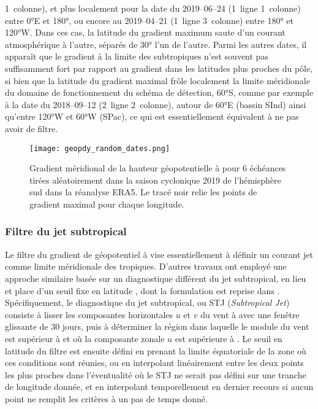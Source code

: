 \documentclass[../main.tex]{subfiles}
\begin{document}
1\iere~colonne), et plus localement pour la date du 2019--06--24 (1\iere~ligne 1\iere~colonne) entre \ang{0}E et \ang{180}, ou encore au 2019--04--21
(1\iere~ligne 3\ieme~colonne) entre \ang{180} et \ang{120}W. Dans ces cas, la latitude du gradient maximum saute d'un courant atmosphérique à l'autre, séparés
de \ang{30} l'un de l'autre. Parmi les autres dates, il apparaît que le gradient à la limite des subtropiques n'est souvent pas suffisamment fort par rapport au
gradient dans les latitudes plus proches du pôle, si bien que la latitude du gradient maximal frôle localement la limite méridionale du domaine de
fonctionnement du schéma de détection, \ang{60}S, comme par exemple à la date du 2018--09--12 (2\ieme~ligne 2\ieme~colonne), autour de \ang{60}E (bassin SInd)
ainsi qu'entre \ang{120}W et \ang{60}W (SPac), ce qui est essentiellement équivalent à ne pas avoir de filtre.
%
\begin{figure}[tb]
    \centering
    \texttt{[image: geopdy\_random\_dates.png]}
    \caption{Gradient méridional de la hauteur géopotentielle à  pour 6 échéances tirées aléatoirement dans la saison cyclonique 2019 de l'hémisphère
    sud dans la réanalyse ERA5. Le tracé noir relie les points de gradient maximal pour chaque longitude.}
    \label{fig:geopdy_random}
\end{figure}

\subsubsection*{Filtre du jet subtropical}

Le filtre du gradient de géopotentiel à  vise essentiellement à définir un courant jet comme limite méridionale des tropiques. D'autres travaux ont
employé une approche similaire basée sur un diagnostique différent du jet subtropical, en lieu et place d'un seuil fixe en latitude
\parencite{tory_projected_2013,tory_sea_2015,bell_statistical_2018}, dont la formulation est reprise dans \textcite{bourdin_intercomparison_2022}. Spécifiquement,
le diagnostique du jet subtropical, ou STJ (\textit{Subtropical Jet}) consiste à lisser les composantes horizontales $u$ et $v$ du vent à  avec une
fenêtre glissante de 30 jours, puis à déterminer la région dans laquelle le module du vent est supérieur à  et où la composante zonale $u$ est supérieure
à . Le seuil en latitude du filtre est ensuite défini en prenant la limite équatoriale de la zone où ces conditions sont réunies, ou en interpolant
linéairement entre les deux points les plus proches dans l'éventualité où le STJ ne serait pas défini sur une tranche de longitude donnée, et en interpolant
temporellement en dernier recours si aucun point ne remplit les critères à un pas de temps donné. 
\end{document}
